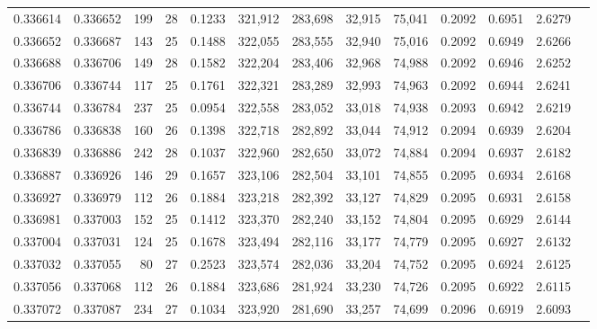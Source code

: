 \begin{tabular}{rrrrrrrrrrrrr}
0.336614 & 0.336652 &   199 &  28 &                                     0.1233 & 321,912 & 283,698 &  32,915 &  75,041 & 0.2092 & 0.6951 & 2.6279 \\
0.336652 & 0.336687 &   143 &  25 &                                     0.1488 & 322,055 & 283,555 &  32,940 &  75,016 & 0.2092 & 0.6949 & 2.6266 \\
0.336688 & 0.336706 &   149 &  28 &                                     0.1582 & 322,204 & 283,406 &  32,968 &  74,988 & 0.2092 & 0.6946 & 2.6252 \\
0.336706 & 0.336744 &   117 &  25 &                                     0.1761 & 322,321 & 283,289 &  32,993 &  74,963 & 0.2092 & 0.6944 & 2.6241 \\
0.336744 & 0.336784 &   237 &  25 &                                     0.0954 & 322,558 & 283,052 &  33,018 &  74,938 & 0.2093 & 0.6942 & 2.6219 \\
0.336786 & 0.336838 &   160 &  26 &                                     0.1398 & 322,718 & 282,892 &  33,044 &  74,912 & 0.2094 & 0.6939 & 2.6204 \\
0.336839 & 0.336886 &   242 &  28 &                                     0.1037 & 322,960 & 282,650 &  33,072 &  74,884 & 0.2094 & 0.6937 & 2.6182 \\
0.336887 & 0.336926 &   146 &  29 &                                     0.1657 & 323,106 & 282,504 &  33,101 &  74,855 & 0.2095 & 0.6934 & 2.6168 \\
0.336927 & 0.336979 &   112 &  26 &                                     0.1884 & 323,218 & 282,392 &  33,127 &  74,829 & 0.2095 & 0.6931 & 2.6158 \\
0.336981 & 0.337003 &   152 &  25 &                                     0.1412 & 323,370 & 282,240 &  33,152 &  74,804 & 0.2095 & 0.6929 & 2.6144 \\
0.337004 & 0.337031 &   124 &  25 &                                     0.1678 & 323,494 & 282,116 &  33,177 &  74,779 & 0.2095 & 0.6927 & 2.6132 \\
0.337032 & 0.337055 &    80 &  27 &                                     0.2523 & 323,574 & 282,036 &  33,204 &  74,752 & 0.2095 & 0.6924 & 2.6125 \\
0.337056 & 0.337068 &   112 &  26 &                                     0.1884 & 323,686 & 281,924 &  33,230 &  74,726 & 0.2095 & 0.6922 & 2.6115 \\
0.337072 & 0.337087 &   234 &  27 &                                     0.1034 & 323,920 & 281,690 &  33,257 &  74,699 & 0.2096 & 0.6919 & 2.6093 \\

\end{tabular}
